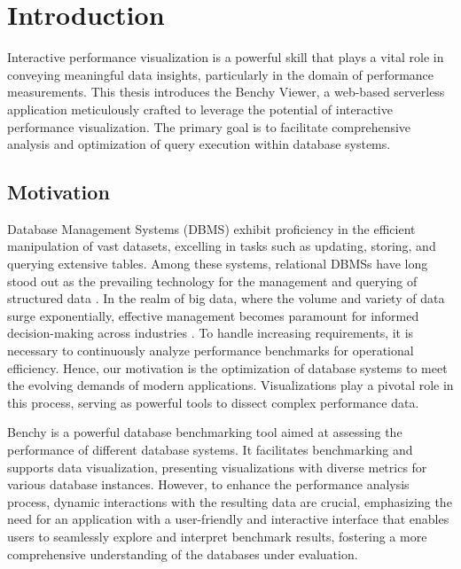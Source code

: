
\chapter{Introduction}\label{chapter:introduction}

Interactive performance visualization is a powerful skill that plays a vital role in conveying meaningful data insights, particularly in the domain of performance measurements. This thesis introduces the Benchy Viewer, a web-based serverless application meticulously crafted to leverage the potential of interactive performance visualization. The primary goal is to facilitate comprehensive analysis and optimization of query execution within database systems.

\section{Motivation}

Database Management Systems (DBMS) exhibit proficiency in the efficient manipulation of vast datasets, excelling in tasks such as updating, storing, and querying extensive tables. Among these systems, relational DBMSs have long stood out as the prevailing technology for the management and querying of structured data \parencite*{analyze-big-data-inside-dbms, literature-big-data}. In the realm of big data, where the volume and variety of data surge exponentially, effective management becomes paramount for informed decision-making across industries \parencite*{big-data}. To handle increasing requirements, it is necessary to continuously analyze performance benchmarks for operational efficiency. Hence, our motivation is the optimization of database systems to meet the evolving demands of modern applications. Visualizations play a pivotal role in this process, serving as powerful tools to dissect complex performance data.

Benchy \parencite*{benchy} is a powerful database benchmarking tool aimed at assessing the performance of different database systems. It facilitates benchmarking and supports data visualization, presenting visualizations with diverse metrics for various database instances. However, to enhance the performance analysis process, dynamic interactions with the resulting data are crucial, emphasizing the need for an application with a user-friendly and interactive interface that enables users to seamlessly explore and interpret benchmark results, fostering a more comprehensive understanding of the databases under evaluation.

